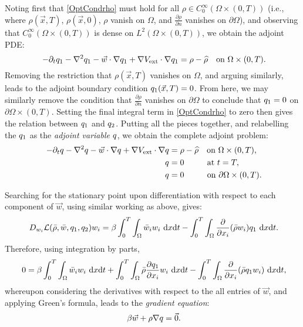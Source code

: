 Noting first that \eqref{OptCondrho} must hold for all $\rho\in{}C_0^{\infty}(\Omega\times(0,T))$ (i.e., where $\rho(\vec{x},T)$, $\rho(\vec{x},0)$, $\rho$ vanish on $\Omega$, and $\frac{\partial\rho}{\partial{}n}$ vanishes on $\partial\Omega$), and observing that $C_0^{\infty}(\Omega\times(0,T))$ is dense on $L^2(\Omega\times(0,T))$, we obtain the adjoint PDE:
\begin{equation*}
\ -\partial_{t}\adj_1-\nabla^{2}\adj_1-\vec{w}\cdot\nabla{}\adj_1+\nabla{}V_{\text{ext}}\cdot\nabla{}\adj_1=\rho-\widehat{\rho}\quad\text{on }\Omega\times(0,T).
\end{equation*}
Removing the restriction that $\rho(\vec{x},T)$ vanishes on $\Omega$, and arguing similarly, leads to the adjoint boundary condition $q_1(\vec{x},T)=0$. From here, we may similarly remove the condition that $\frac{\partial\rho}{\partial{}n}$ vanishes on $\partial\Omega$ to conclude that $q_1=0$ on $\partial\Omega\times(0,T)$. Setting the final integral term in \eqref{OptCondrho} to zero then gives the relation between $q_1$ and $q_2$. Putting all the pieces together, and relabelling the $q_1$ as the \emph{adjoint variable} $q$, we obtain the complete adjoint problem:
\begin{align}
\ \label{Adjoint} -\partial_{t}\adj-\nabla^{2}\adj-\vec{w}\cdot\nabla{}\adj+\nabla{}V_{\text{ext}}\cdot\nabla{}\adj={}&\rho-\widehat{\rho}\quad\text{on }\Omega\times(0,T), \\
\ \nonumber \adj={}&0\quad\hspace{1.8em}\text{at }t=T, \\
\ \nonumber \adj={}&0\quad\hspace{1.8em}\text{on }\partial\Omega\times(0,T).
\end{align}

Searching for the stationary point upon differentiation with respect to each component of $\vec{w}$, using similar working as above, gives:
\begin{equation*}
\ D_{w_i}\mathcal{L}(\bar{\rho},\bar{w},\adj_1,\adj_2)w_i=\beta\int_0^T\int_{\Omega}\bar{w}_{i}w_i~{\rm d}x{\rm d}t-\int_0^T\int_{\Omega}\frac{\partial}{\partial{}x_i}(\bar{\rho}w_i)\adj_1~{\rm d}x{\rm d}t.
\end{equation*}
Therefore, using integration by parts,
\begin{equation*}
\ 0=\beta\int_0^T\int_{\Omega}\bar{w}_{i}w_i~{\rm d}x{\rm d}t+\int_0^T\int_{\Omega}\bar{\rho}\frac{\partial{}q_1}{\partial{}x_i}w_i~{\rm d}x{\rm d}t-\int_0^T\int_{\Omega}\frac{\partial}{\partial{}x_i}(\bar{\rho}q_{1}w_i)~{\rm d}x{\rm d}t,
\end{equation*}
whereupon considering the derivatives with respect to the all entries of $\vec{w}$, and applying Green's formula, leads to the \emph{gradient equation}:
\begin{equation}
\ \label{Gradient} \beta\vec{w}+\rho\nabla{}\adj=\vec{0}.
\end{equation}

